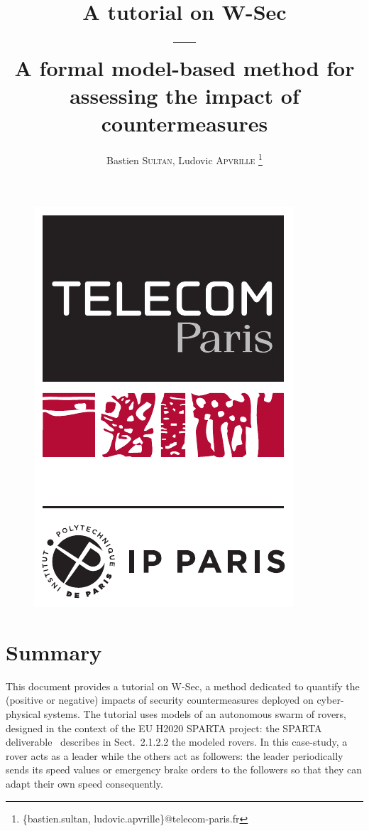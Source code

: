 \documentclass{article}
\author{Bastien \textsc{Sultan}, Ludovic \textsc{Apvrille}
	\thanks{\{bastien.sultan, ludovic.apvrille\}@telecom-paris.fr}}
\affil{\emph{Télécom Paris}\\\emph{LabSoC Research Group}\\\emph{450, route des Chappes, F-06410 Biot}}
\title{\textbf{A tutorial on W-Sec}\\---\\A formal model-based method for assessing the impact of countermeasures}
\date{}
\begin{document}
\begin{figure}[t]
	\centering
	\includegraphics[scale=.4]{figures/logo.pdf}
\end{figure}
\maketitle


\section{Summary}

This document provides a tutorial on W-Sec, a method dedicated to quantify the (positive or negative) impacts of security countermeasures deployed on cyber-physical systems. The tutorial uses models of an autonomous swarm of rovers, designed in the context of the EU H2020 SPARTA project: the SPARTA deliverable~\cite{d51} describes in Sect.~2.1.2.2 the modeled rovers. In this case-study, a rover acts as a leader while the others act as followers: the leader periodically sends its speed values or emergency brake orders to the followers so that they can adapt their own speed consequently.
\end{document}
